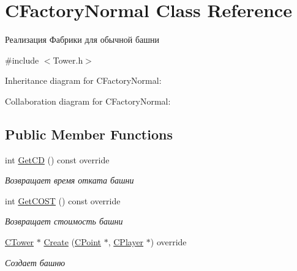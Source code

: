 \hypertarget{classCFactoryNormal}{}\section{C\+Factory\+Normal Class Reference}
\label{classCFactoryNormal}


Реализация Фабрики для обычной башни  




{\ttfamily \#include $<$Tower.\+h$>$}



Inheritance diagram for C\+Factory\+Normal\+:


Collaboration diagram for C\+Factory\+Normal\+:
\subsection*{Public Member Functions}
\begin{DoxyCompactItemize}
\item 
int \hyperlink{classCFactoryNormal_a1d5f550ca47d1c225825f71cc3a09c0b}{Get\+CD} () const override\hypertarget{classCFactoryNormal_a1d5f550ca47d1c225825f71cc3a09c0b}{}\label{classCFactoryNormal_a1d5f550ca47d1c225825f71cc3a09c0b}

\begin{DoxyCompactList}\small\item\em Возвращает время отката башни \end{DoxyCompactList}\item 
int \hyperlink{classCFactoryNormal_ac8b3b9ee22636cc2252bd9f7d78b6b3a}{Get\+C\+O\+ST} () const override\hypertarget{classCFactoryNormal_ac8b3b9ee22636cc2252bd9f7d78b6b3a}{}\label{classCFactoryNormal_ac8b3b9ee22636cc2252bd9f7d78b6b3a}

\begin{DoxyCompactList}\small\item\em Возвращает стоимость башни \end{DoxyCompactList}\item 
\hyperlink{classCTower}{C\+Tower} $\ast$ \hyperlink{classCFactoryNormal_af7b86c0f61e356b08e1f4edada257c93}{Create} (\hyperlink{classCPoint}{C\+Point} $\ast$, \hyperlink{classCPlayer}{C\+Player} $\ast$) override
\begin{DoxyCompactList}\small\item\em Создает башню \end{DoxyCompactList}\end{DoxyCompactItemize}


